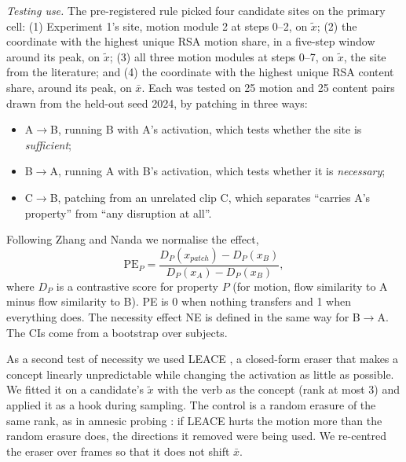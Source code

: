 \documentclass[twoside,english]{article}
\newcommand{\xs}{\bar{x}}         %
\newcommand{\xd}{\tilde{x}}       %
\begin{document}
\emph{Testing use.} The pre-registered rule picked four candidate sites on the primary cell:
(1) Experiment 1's site,  motion module 2 at steps 0--2, on $\xd$; (2) the coordinate
with the highest unique RSA motion share, in a five-step window around its peak, on $\xd$; (3) all three
 motion modules at steps 0--7, on $\xd$, the site from the literature; and (4) the
coordinate with the highest unique RSA content share, around its peak, on $\xs$. Each was tested on 25
motion and 25 content pairs drawn from the held-out seed 2024, by patching in three ways:
\begin{itemize}
\item A$\to$B, running B with A's activation, which tests whether the site is \emph{sufficient};
\item B$\to$A, running A with B's activation, which tests whether it is \emph{necessary};
\item C$\to$B, patching from an unrelated clip C, which separates ``carries A's property'' from ``any
  disruption at all''.
\end{itemize}
Following Zhang and Nanda \citep{zhang2024patching} we normalise the effect,
\begin{equation}
\mathrm{PE}_P = \frac{D_P(x_{patch}) - D_P(x_B)}{D_P(x_A) - D_P(x_B)},
\end{equation}
where $D_P$ is a contrastive score for property $P$ (for motion, flow similarity to A minus flow
similarity to B). PE is 0 when nothing transfers and 1 when everything does. The necessity effect NE is
defined in the same way for B$\to$A. The CIs come from a bootstrap over subjects.

As a second test of necessity we used LEACE \citep{belrose2023leace}, a closed-form eraser that makes a
concept linearly unpredictable while changing the activation as little as possible. We fitted it on a
candidate's $\xd$ with the verb as the concept (rank at most 3) and applied it as a hook during sampling.
The control is a random erasure of the same rank, as in amnesic probing \citep{elazar2021amnesic}: if
LEACE hurts the motion more than the random erasure does, the directions it removed were being used. We
re-centred the eraser over frames so that it does not shift $\xs$.
\end{document}
